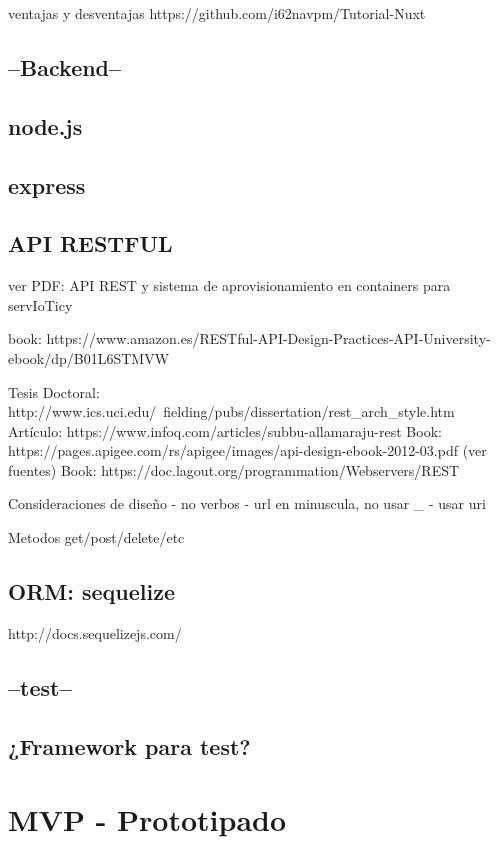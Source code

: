 ventajas y desventajas
https://github.com/i62navpm/Tutorial-Nuxt

\subsection{--Backend--}
\subsection{node.js}
\subsection{express}
\subsection{API RESTFUL}
ver PDF: API REST y sistema de aprovisionamiento en containers para servIoTicy

book: https://www.amazon.es/RESTful-API-Design-Practices-API-University-ebook/dp/B01L6STMVW

Tesis Doctoral: http://www.ics.uci.edu/~fielding/pubs/dissertation/rest_arch_style.htm
Artículo: https://www.infoq.com/articles/subbu-allamaraju-rest
Book: https://pages.apigee.com/rs/apigee/images/api-design-ebook-2012-03.pdf (ver fuentes)
Book: https://doc.lagout.org/programmation/Webservers/REST%

Consideraciones de diseño 
  - no verbos
  - url en minuscula, no usar _ 
  - usar uri
  
Metodos get/post/delete/etc

\subsection{ORM: sequelize}
http://docs.sequelizejs.com/

\subsection{--test--}
\subsection{¿Framework para test?}


\section{MVP - Prototipado}

